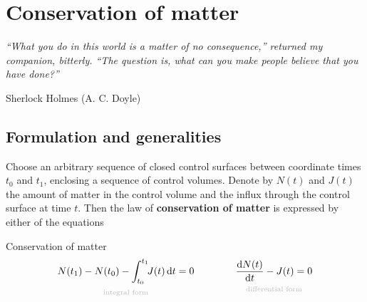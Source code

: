 \documentclass[a4paper,12pt,%
onecolumn,oneside,titlepage,%
british%
]{memoir}
\newcommand*{\di}{\mathrm{d}}%
\renewcommand*{\|}[1][]{\nonscript\:#1\vert\nonscript\:\mathopen{}}
\newcommand*{\yti}{t_{0}}
\newcommand*{\ytf}{t_{1}}
\newcommand*{\yN}{N}
\newcommand*{\yJ}{J}
\begin{document}
%

\printpagenotes*
\fi

\iffalse
\printpagenotes*
\clearpage
\chapter{Conservation of matter}
\label{ncha:cons_matter}

\epigraph{\emph{%
\enquote{What you do in this world is a matter of no consequence,} returned my companion, bitterly. \enquote{The question is, what can you make people believe that you have done?\textellipsis}%
}}{Sherlock Holmes (A. C. Doyle) \cites*{doyle1887}}

\section{Formulation and generalities}
\label{nsec:cons_matter_formulation}

Choose an arbitrary sequence of closed control surfaces between coordinate times $\yti$ and $\ytf$, enclosing a sequence of control volumes. Denote by $\yN(t)$ and $\yJ(t)$ the amount of matter in the control volume and the influx through the control surface at time $t$. Then the law of \textbf{conservation of matter} is expressed by either of the equations
\begin{definition}{Conservation of matter}
  \begin{equation}
    \label{neq:cons_matter}
    \begin{gathered}
      \underbracket[0pt]{\yN(\ytf) - \yN(\yti) - \int_{\yti}^{\ytf}\!\!\yJ(t)\,\di t = 0}_{\mathclap{\text{\color{grey}integral form}}}
      \qquad%
      \qquad
      \underbracket[0pt]{\frac{\di\yN(t)}{\di t} - \yJ(t) = 0}_{\mathclap{\text{\color{grey}differential form}}}
    \end{gathered}
  \end{equation}
\end{definition}
\end{document}
